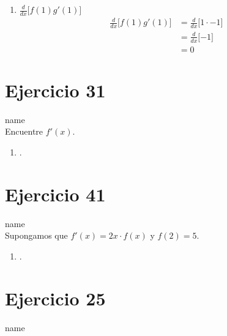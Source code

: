 \documentclass[12pt]{article}
\begin{document}
\begin{enumerate}[label=(\alph*)]
\item $\frac{d}{dx} \lbrack f(1)g'(1) \rbrack$
  \begin{equation*}
    \begin{split}
      \frac{d}{dx} \lbrack f(1)g'(1) \rbrack
      & = \frac{d}{dx} \lbrack 1 \cdot -1 \rbrack \\
      & = \frac{d}{dx} \lbrack -1 \rbrack \\
      & = 0
    \end{split}
  \end{equation*}
  
\end{enumerate}

\section{Ejercicio 31} name \\

Encuentre $f'(x)$.
\begin{enumerate}[label=(\alph*)]
\item .
\end{enumerate}

\section{Ejercicio 41} name \\

Supongamos que $f'(x) = 2x \cdot f(x)$ y $f(2) = 5$.
\begin{enumerate}[label=(\alph*)]
\item .
\end{enumerate}

\section{Ejercicio 25} name \\
\end{document}
